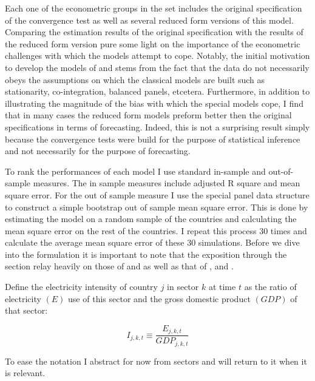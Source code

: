 \documentclass[]{amsart}
\begin{document}
Each one of the econometric groups in the set includes the original specification of the convergence test as well as several reduced form versions of this model. 
Comparing the estimation results of the original specification with the results of the reduced form version pure some light on the importance of the econometric challenges with which the models attempt to cope. Notably, the initial motivation to develop the models of \cite{barro1992convergence} and \cite{PhillipsSul2007} stems from the fact that the data do not necessarily obeys the assumptions on which the classical models are built such as stationarity, co-integration, balanced panels, etcetera. Furthermore, in addition to illustrating the magnitude of the bias with which the special models cope, I find that in many cases the reduced form models preform better then the original specifications in terms of forecasting. Indeed, this is not a surprising result simply because the convergence tests were build for the purpose of statistical inference and not necessarily for the purpose of forecasting.

\bigskip

To rank the performances of each model I use standard in-sample and out-of-sample measures. The in sample measures include adjusted R square and mean square error. For the out of sample measure I use the special panel data structure to construct a simple bootstrap out of sample mean square error. This is done by estimating the model on a random sample of the countries and calculating the mean square error on the rest of the countries. I repeat this process 30 times and calculate the average mean square error of these 30 simulations. Before we dive into the formulation it is important to note that the exposition through the section relay heavily on those of \cite{barro1992convergence} and \cite{PhillipsSul2007} as well as that of \cite{sala1996classical}, \cite{durlauf2005growth} and \cite{young2008sigma}.

\bigskip

Define the electricity intensity of country $j$ in sector $k$ at time $t$ as the ratio of electricity $(E)$ use of this sector and the gross domestic product $(GDP)$ of that sector: 

\begin{equation}
I_{j,k,t} \equiv \frac{E_{j,k,t}}{GDP_{j,k,t}}
 \label{Intensity} 
\end{equation}

\bigskip

To ease the notation I abstract for now from sectors and will return to it when it is relevant. 
\end{document}
